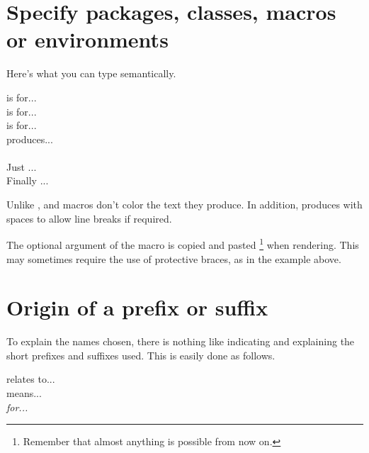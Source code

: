 \section{Specify packages, classes, macros or environments}

Here's what you can type semantically.


\begin{tdoclatex}[sbs]
 is for...              \\
 is for...           \\
 is for...           \\
 produces...                \\
            \\
Just ...                   \\
Finally ...
\end{tdoclatex}


\begin{tdocrem}
    Unlike ,  and  macros don't color the text they produce.
    In addition,  produces  with spaces to allow line breaks if required.
\end{tdocrem}


\begin{tdocwarn}
    The optional argument of the  macro is copied and pasted
    \footnote{
        Remember that almost anything is possible from now on.
    }
    when rendering. This may sometimes require the use of protective braces, as in the example above.
\end{tdocwarn}



\section{Origin of a prefix or suffix}

To explain the names chosen, there is nothing like indicating and explaining the short prefixes and suffixes used. This is easily done as follows.


\begin{tdoclatex}[sbs]
 relates to...      \\
 means...   \\
\emph{ for...}
\end{tdoclatex}


